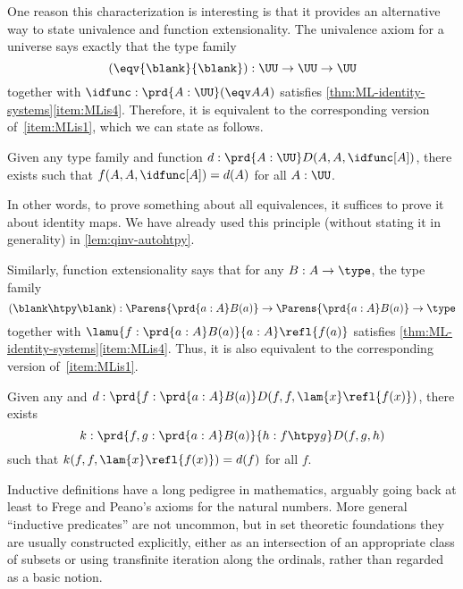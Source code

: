 %

One reason this characterization is interesting is that it provides an alternative way to state univalence and function extensionality.
%
The univalence axiom for a universe \UU says exactly that the type family
\[ (\eqv{\blank}{\blank}) : \UU\to\UU\to\UU \]
together with $\idfunc : \prd{A:\UU} (\eqv AA)$ satisfies \cref{thm:ML-identity-systems}\ref{item:MLis4}.
Therefore, it is equivalent to the corresponding version of~\ref{item:MLis1}, which we can state as follows.

\begin{cor}\label{thm:equiv-induction}
  Given any type family  and function $d:\prd{A:\UU} D(A,A,\idfunc[A])$, there exists  such that $f(A,A,\idfunc[A]) = d(A)$ for all $A:\UU$.
\end{cor}

In other words, to prove something about all equivalences, it suffices to prove it about identity maps.
We have already used this principle (without stating it in generality) in \cref{lem:qinv-autohtpy}.

Similarly, function extensionality says that for any $B:A\to\type$, the type family
\[ (\blank\htpy\blank) : \Parens{\prd{a:A} B(a)} \to \Parens{\prd{a:A} B(a)} \to \type
\]
together with $\lamu{f:\prd{a:A} B(a)}{a:A} \refl{f(a)}$ satisfies \cref{thm:ML-identity-systems}\ref{item:MLis4}.
Thus, it is also equivalent to the corresponding version of~\ref{item:MLis1}.

\begin{cor}\label{thm:htpy-induction}
  Given any  and $d:\prd{f:\prd{a:A} B(a)} D(f,f,\lam{x}\refl{f(x)})$, there exists
  \begin{equation*}
    k:\prd{f,g:\prd{a:A} B(a)}{h:f\htpy g} D(f,g,h)
  \end{equation*}
  such that $k(f,f,\lam{x}\refl{f(x)}) = d(f)$ for all $f$.
\end{cor}

\sectionNotes

Inductive definitions have a long pedigree in mathematics, arguably going back at least to Frege and Peano's axioms for the natural numbers. %
More general ``inductive predicates'' are not uncommon, but in set theoretic foundations they are usually constructed explicitly, either as an intersection of an appropriate class of subsets or using transfinite iteration along the ordinals, rather than regarded as a basic notion.

